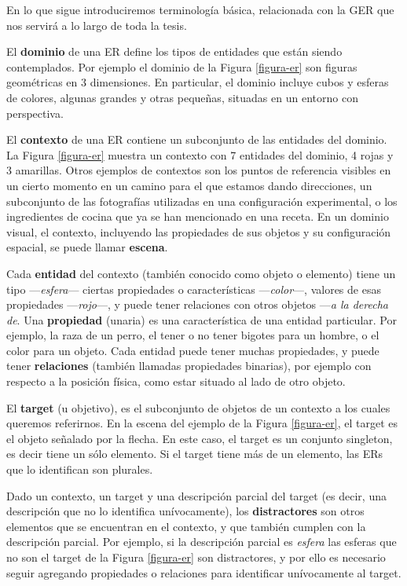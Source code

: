 En lo que sigue introduciremos terminolog\'ia b\'asica, relacionada con la GER que nos servir\'a a lo largo de toda la tesis.

El {\bf dominio} de una ER define los tipos de entidades que est\'an siendo contemplados. Por ejemplo el dominio de la Figura \ref{figura-er} son figuras geom\'etricas en 3 dimensiones. En particular, el dominio incluye cubos y esferas de colores, algunas grandes y otras peque\~nas, situadas en un entorno con perspectiva.

El {\bf contexto} de una ER contiene un subconjunto de las entidades del dominio. La Figura \ref{figura-er} muestra un contexto con 7 entidades del dominio, 4 rojas y 3 amarillas. Otros ejemplos de contextos son los puntos de referencia visibles en un cierto momento en un camino para el que estamos dando direcciones, un subconjunto de las fotograf\'ias utilizadas en una configuraci\'on experimental, o los ingredientes de cocina que ya se han mencionado en una receta. En un dominio visual, el contexto, incluyendo las propiedades de sus objetos y su configuraci\'on espacial, se puede llamar \textbf{escena}. 

Cada {\bf entidad} del contexto (tambi\'en conocido como objeto o elemento) tiene un tipo ---\emph{esfera}--- ciertas propiedades o caracter\'isticas ---\emph{color}---, valores de esas propiedades ---\emph{rojo}---, y puede tener relaciones con otros objetos ---\emph{a la derecha de}. Una {\bf propiedad} (unaria) es una caracter\'istica de una entidad particular. Por ejemplo, la raza de un perro, el tener o no tener bigotes para un hombre, o el color para un objeto. Cada entidad puede tener muchas propiedades, y puede tener {\bf relaciones} (tambi\'en llamadas propiedades binarias), por ejemplo con respecto a la posici\'on f\'isica, como estar situado al lado de otro objeto. 

El {\bf target} (u objetivo), es el subconjunto de objetos de un contexto a los cuales queremos referirnos. En la escena del ejemplo de la Figura \ref{figura-er}, el target es el objeto se\~nalado por la flecha. En este caso, el target es un conjunto singleton, es decir tiene un s\'olo elemento. Si el target tiene m\'as de un elemento, las ERs que lo identifican son plurales.

Dado un contexto, un target y una descripci\'on parcial del target (es decir, una descripci\'on que no lo identifica un\'ivocamente), los {\bf distractores} son otros elementos que se encuentran en el contexto, y que tambi\'en cumplen con la descripci\'on parcial. Por ejemplo, si la descripci\'on parcial es {\it esfera} las esferas que no son el target de la Figura \ref{figura-er} son  distractores, y por ello es necesario seguir agregando propiedades o relaciones para identificar un\'ivocamente al target.

